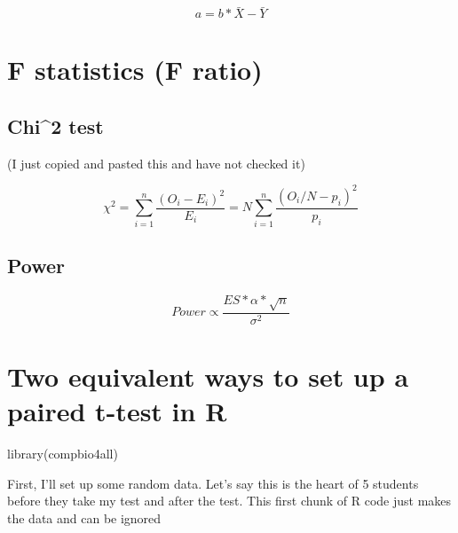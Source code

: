 \documentclass[
]{book}
\newenvironment{Shaded}{\begin{snugshade}}{\end{snugshade}}
\newcommand{\FunctionTok}[1]{\textcolor[rgb]{0.00,0.00,0.00}{#1}}
\newcommand{\NormalTok}[1]{#1}
\begin{document}
\[a = b*\bar{X} - \bar{Y}\]

\hypertarget{f-statistics-f-ratio}{%
\chapter{F statistics (F ratio)}\label{f-statistics-f-ratio}}

\hypertarget{chi2-test}{%
\section{Chi\^{}2 test}\label{chi2-test}}

(I just copied and pasted this and have not checked it)

\[{\chi ^{2}=\sum _{i=1}^{n}{\frac {(O_{i}-E_{i})^{2}}{E_{i}}}=N\sum _{i=1}^{n}{\frac {\left(O_{i}/N-p_{i}\right)^{2}}{p_{i}}}}\]

\hypertarget{power}{%
\section{Power}\label{power}}

\[Power \propto \frac{ES*\alpha*\sqrt{n}}{\sigma^2}\]

\hypertarget{two-equivalent-ways-to-set-up-a-paired-t-test-in-r}{%
\chapter{Two equivalent ways to set up a paired t-test in R}\label{two-equivalent-ways-to-set-up-a-paired-t-test-in-r}}

\begin{Shaded}
\begin{Highlighting}[]
\FunctionTok{library}\NormalTok{(compbio4all)}
\end{Highlighting}
\end{Shaded}

First, I'll set up some random data. Let's say this is the heart of 5 students before they take my test and after the test. This first chunk of R code just makes the data and can be ignored
\end{document}
